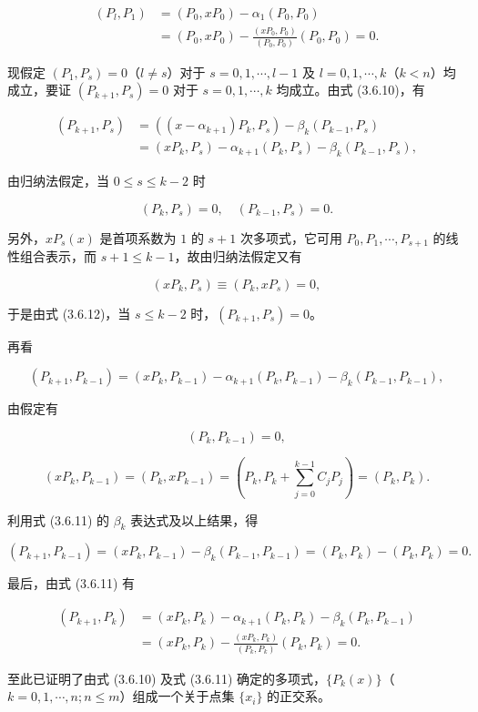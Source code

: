 \[
\begin{aligned}
(P_l,P_1)&=(P_0,xP_0)-\alpha_1(P_0,P_0)\\
&=(P_0,xP_0)-\frac{(xP_0,P_0)}{(P_0,P_0)}(P_0,P_0)=0.
\end{aligned}
\]

现假定 \((P_1,P_s)=0\)（\(l\ne s\)）对于 \(s=0,1,\cdots,l-1\) 及 \(l=0,1,\cdots,k\)（\(k<n\)）均成立，要证 \((P_{k+1},P_s)=0\) 对于 \(s=0,1,\cdots,k\) 均成立。由式 (3.6.10)，有

\[
\begin{aligned}
(P_{k+1},P_s)&=((x-\alpha_{k+1})P_k,P_s)-\beta_k(P_{k-1},P_s)\\
&=(xP_k,P_s)-\alpha_{k+1}(P_k,P_s)-\beta_k(P_{k-1},P_s),
\end{aligned}\tag{3.6.12}
\]

由归纳法假定，当 \(0\leqslant s\leqslant k-2\) 时

\[
(P_k,P_s)=0,\quad(P_{k-1},P_s)=0.
\]

另外，\(xP_s(x)\) 是首项系数为 \(1\) 的 \(s+1\) 次多项式，它可用 \(P_0,P_1,\cdots,P_{s+1}\) 的线性组合表示，而 \(s+1\leqslant k-1\)，故由归纳法假定又有

\[
(xP_k,P_s)\equiv(P_k,xP_s)=0,
\]

于是由式 (3.6.12)，当 \(s\leqslant k-2\) 时，\((P_{k+1},P_s)=0\)。

再看

\[
(P_{k+1},P_{k-1})=(xP_k,P_{k-1})-\alpha_{k+1}(P_k,P_{k-1})-\beta_k(P_{k-1},P_{k-1}),\tag{3.6.13}
\]

由假定有

\[
(P_k,P_{k-1})=0,
\]

\[
(xP_k,P_{k-1})=(P_k,xP_{k-1})=\left(P_k,P_k+\sum_{j=0}^{k-1}C_jP_j\right)=(P_k,P_k).
\]

利用式 (3.6.11) 的 \(\beta_k\) 表达式及以上结果，得

\[
(P_{k+1},P_{k-1})=(xP_k,P_{k-1})-\beta_k(P_{k-1},P_{k-1})=(P_k,P_k)-(P_k,P_k)=0.
\]

最后，由式 (3.6.11) 有

\[
\begin{aligned}
(P_{k+1},P_k)&=(xP_k,P_k)-\alpha_{k+1}(P_k,P_k)-\beta_k(P_k,P_{k-1})\\
&=(xP_k,P_k)-\frac{(xP_k,P_k)}{(P_k,P_k)}(P_k,P_k)=0.
\end{aligned}
\]

至此已证明了由式 (3.6.10) 及式 (3.6.11) 确定的多项式，\(\{P_k(x)\}\)（\(k=0,1,\cdots,n;n\leqslant m\)）组成一个关于点集 \(\{x_i\}\) 的正交系。

